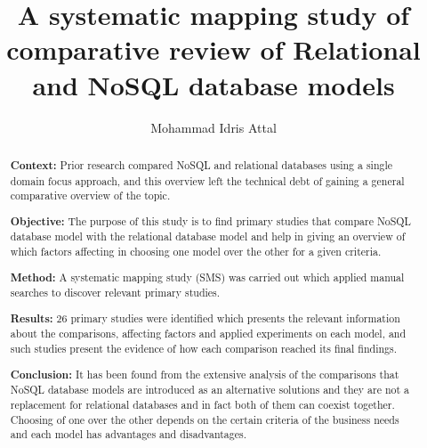 \documentclass[sigconf,nonacm]{acmart}
\begin{document}
\pagestyle{empty}

\title{A systematic mapping study of comparative review of Relational and NoSQL database models}

\author{Mohammad Idris Attal}



\renewcommand{\shortauthors}{Idris Attal}

\begin{abstract}
\textbf{Context: }Prior research compared NoSQL and relational databases using a single domain focus approach, and this overview left the technical debt of gaining a general comparative overview of the topic.
 
\textbf{Objective: }The purpose of this study is to find primary studies that compare NoSQL database model with the relational database model and help in giving an overview of which factors affecting in choosing one model over the other for a given criteria.

\textbf{Method: }A systematic mapping study (SMS) was carried out which applied manual searches to discover relevant primary studies.

\textbf{Results: }26 primary studies were identified which presents the relevant information about the comparisons, affecting factors and applied experiments on each model, and such studies present the evidence of how each comparison reached its final findings.

\textbf{Conclusion: }It has been found from the extensive analysis of the comparisons that NoSQL database models are introduced as an alternative solutions and they are not a replacement for relational databases and in fact both of them can coexist together. Choosing of one over the other depends on the certain criteria of the business needs and each model has advantages and disadvantages.

\end{abstract}
\end{document}

